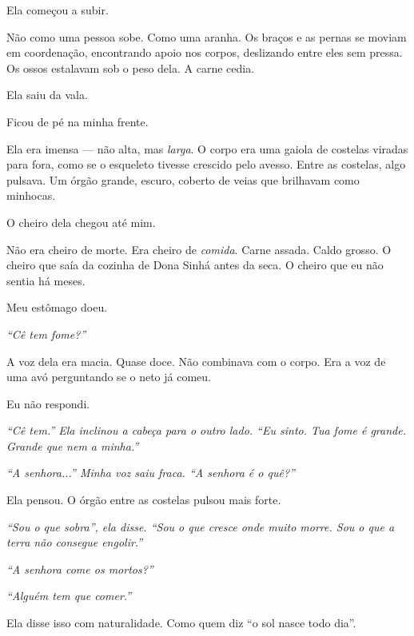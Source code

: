 \noindent Ela começou a subir.

\noindent Não como uma pessoa sobe. Como uma aranha. Os braços e as pernas se moviam em coordenação, encontrando apoio nos corpos, deslizando entre eles sem pressa. Os ossos estalavam sob o peso dela. A carne cedia.

\noindent Ela saiu da vala.

\noindent Ficou de pé na minha frente.

\noindent Ela era imensa --- não alta, mas \textit{larga}. O corpo era uma gaiola de costelas viradas para fora, como se o esqueleto tivesse crescido pelo avesso. Entre as costelas, algo pulsava. Um órgão grande, escuro, coberto de veias que brilhavam como minhocas.

\noindent O cheiro dela chegou até mim.

\noindent Não era cheiro de morte. Era cheiro de \textit{comida}. Carne assada. Caldo grosso. O cheiro que saía da cozinha de Dona Sinhá antes da seca. O cheiro que eu não sentia há meses.

\noindent Meu estômago doeu.

\noindent \textit{\textquotedblleft{}Cê tem fome?\textquotedblright{}}

\noindent A voz dela era macia. Quase doce. Não combinava com o corpo. Era a voz de uma avó perguntando se o neto já comeu.

\noindent Eu não respondi.

\noindent \textit{\textquotedblleft{}Cê tem.\textquotedblright{}\textit{ Ela inclinou a cabeça para o outro lado. }\textquotedblleft{}Eu sinto. Tua fome é grande. Grande que nem a minha.\textquotedblright{}}

\noindent \textit{\textquotedblleft{}A senhora...\textquotedblright{}\textit{ Minha voz saiu fraca. }\textquotedblleft{}A senhora é o quê?\textquotedblright{}}

\noindent Ela pensou. O órgão entre as costelas pulsou mais forte.

\noindent \textit{\textquotedblleft{}Sou o que sobra\textquotedblright{}\textit{, ela disse. }\textquotedblleft{}Sou o que cresce onde muito morre. Sou o que a terra não consegue engolir.\textquotedblright{}}

\noindent \textit{\textquotedblleft{}A senhora come os mortos?\textquotedblright{}}

\noindent \textit{\textquotedblleft{}Alguém tem que comer.\textquotedblright{}}

\noindent Ela disse isso com naturalidade. Como quem diz \textquotedblleft{}o sol nasce todo dia\textquotedblright{}.

